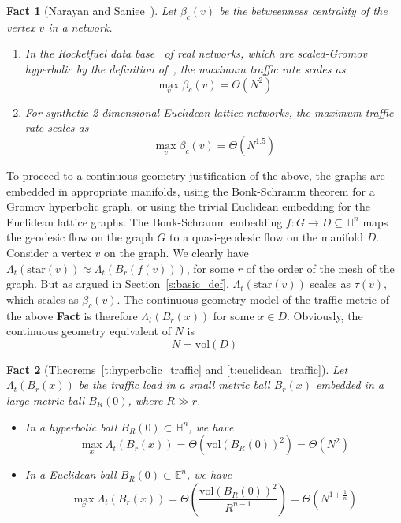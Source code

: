 \documentclass{article}
\newcommand{\vol}{\mathrm{vol}}
\newtheorem{fact}{Fact}
\begin{document}
\begin{fact}[Narayan and Saniee~\cite{arXiv_dmitri}]
\label{fact:experimental}
Let $\beta_c(v)$ be the betweenness centrality of the vertex $v$ in a network. 
\begin{enumerate}
\item In the Rocketfuel data base~\cite{rocketfuel} of real networks, 
which are scaled-Gromov hyperbolic by the definition of~\cite{scaled_gromov}, 
the maximum traffic rate scales as 
$$ \max_v \beta_c(v) = \Theta(N^2) $$
\item For synthetic 2-dimensional Euclidean lattice networks,  
the  maximum traffic rate scales as
$$ \max_v \beta_c(v) = \Theta(N^{1.5}) $$
\end{enumerate}
\end{fact}

To proceed to a continuous geometry justification of the above, 
the graphs are embedded in appropriate manifolds, 
using the Bonk-Schramm theorem for a Gromov hyperbolic graph, 
or using the trivial Euclidean embedding for the Euclidean lattice graphs. 
The Bonk-Schramm embedding $f : G \rightarrow D \subseteq \mathbb{H}^n$ maps 
the geodesic flow on the graph $G$  
to a quasi-geodesic flow on the manifold $D$. 
Consider a vertex $v$ on the graph. We clearly have $\Lambda_t(\mbox{star}(v)) \approx \Lambda_t(B_r(f(v)))$, 
for some $r$ of the order of the mesh of the graph.  
But as argued in Section~\ref{s:basic_def}, $\Lambda_t(\mbox{star}(v))$ scales as $\tau(v)$, 
which scales as $\beta_c(v)$. 
The continuous geometry model 
of the traffic metric of the above {\bf Fact} is therefore $\Lambda_t(B_r(x))$ for some $x \in D$. 
Obviously, the continuous geometry equivalent of $N$ is 
$$ N=\vol (D) $$

\begin{fact}[Theorems~\ref{t:hyperbolic_traffic} and \ref{t:euclidean_traffic}]
\label{fact:theoretical}
Let $\Lambda_t(B_r(x))$ be the traffic load in a small metric ball $B_r(x)$ embedded in a large metric ball $B_R(0)$, 
where $R \gg r$. 
\begin{itemize}
\item In a hyperbolic ball $B_R(0) \subset \mathbb{H}^n$, we have 
$$ \max_x \Lambda_t(B_r(x))=\Theta(\vol(B_R(0))^2)=\Theta(N^2) $$
\item In a Euclidean ball $B_R(0) \subset \mathbb{E}^n$, we have 
$$\max_x \Lambda_t(B_r(x))=\Theta \left( \frac{\vol(B_R(0))^2}{R^{n-1}}\right)=\Theta\left(N^{1+\frac{1}{n}}\right)$$
\end{itemize}
\end{fact}
\end{document}
